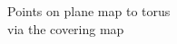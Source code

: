 \documentclass[preview]{standalone}
\begin{document}
\begin{center}
Points on plane map to torus\\via the covering map
\end{center}
\end{document}
